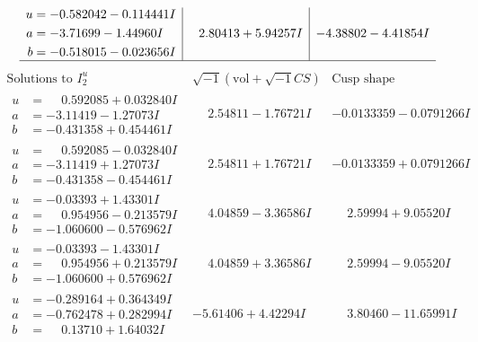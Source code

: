 \documentclass[1p]{elsarticle_modified}
\theoremstyle{definition}
\newcommand{\I}{\sqrt{-1}}
\begin{document}
$$\begin{array}{c|c|c}
\begin{aligned}
u &= -0.582042 - 0.114441 I \\
a &= -3.71699 - 1.44960 I \\
b &= -0.518015 - 0.023656 I\end{aligned}
 & \phantom{-}2.80413 + 5.94257 I & -4.38802 - 4.41854 I\\
 \hline 
 \end{array}$$\newpage$$\begin{array}{c|c|c}  
\text{Solutions to }I^u_{2}& \I (\text{vol} + \sqrt{-1}CS) & \text{Cusp shape}\\
 \hline 
\begin{aligned}
u &= \phantom{-}0.592085 + 0.032840 I \\
a &= -3.11419 - 1.27073 I \\
b &= -0.431358 + 0.454461 I\end{aligned}
 & \phantom{-}2.54811 - 1.76721 I & -0.0133359 - 0.0791266 I \\ \hline\begin{aligned}
u &= \phantom{-}0.592085 - 0.032840 I \\
a &= -3.11419 + 1.27073 I \\
b &= -0.431358 - 0.454461 I\end{aligned}
 & \phantom{-}2.54811 + 1.76721 I & -0.0133359 + 0.0791266 I \\ \hline\begin{aligned}
u &= -0.03393 + 1.43301 I \\
a &= \phantom{-}0.954956 - 0.213579 I \\
b &= -1.060600 - 0.576962 I\end{aligned}
 & \phantom{-}4.04859 - 3.36586 I & \phantom{-}2.59994 + 9.05520 I \\ \hline\begin{aligned}
u &= -0.03393 - 1.43301 I \\
a &= \phantom{-}0.954956 + 0.213579 I \\
b &= -1.060600 + 0.576962 I\end{aligned}
 & \phantom{-}4.04859 + 3.36586 I & \phantom{-}2.59994 - 9.05520 I \\ \hline\begin{aligned}
u &= -0.289164 + 0.364349 I \\
a &= -0.762478 + 0.282994 I \\
b &= \phantom{-}0.13710 + 1.64032 I\end{aligned}
 & -5.61406 + 4.42294 I & \phantom{-}3.80460 - 11.65991 I \\ \hline\begin{aligned}

\end{aligned}
\end{array}$$
\end{document}
